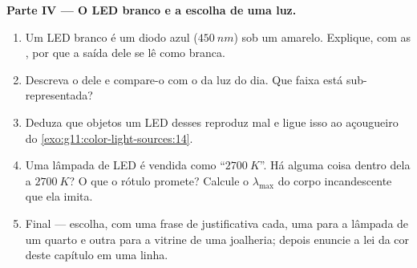 \begin{problem}
\medskip
\noindent\textbf{Parte IV --- O LED branco e a escolha de uma luz.}
\begin{enumerate}[resume]
  \item Um LED branco é um diodo azul ($\qty{450}{nm}$) sob um 
        amarelo. Explique, com as , por que a saída
        dele se lê como branca.
  \item Descreva o  dele e compare-o com o  da
        luz do dia. Que faixa está sub-representada?
  \item Deduza que objetos um LED desses reproduz mal e ligue isso ao
        açougueiro do \cref{exo:g11:color-light-sources:14}.
  \item Uma lâmpada de LED é vendida como ``$\qty{2700}{K}$''. Há alguma
        coisa dentro dela a $\qty{2700}{K}$? O que o rótulo promete?
        Calcule o $\lambda_{\max}$ do corpo incandescente que ela imita.
  \item Final --- escolha, com uma frase de justificativa cada, uma
         para a lâmpada de um quarto e outra para a
        vitrine de uma joalheria; depois enuncie a lei da cor deste
        capítulo em uma linha.
\end{enumerate}
\end{problem}
